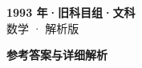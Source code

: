 \documentclass[zihao=-4, a4paper]{ctexart}
\begin{document}
\begin{center}
  {\Large\bfseries 1993 年·旧科目组·文科}\\[4pt]
  {\large 数学 · 解析版}
\end{center}
\medskip
{}

\clearpage
{}
\begin{center}{\Large\bfseries 参考答案与详细解析}\end{center}
\medskip

\end{document}
